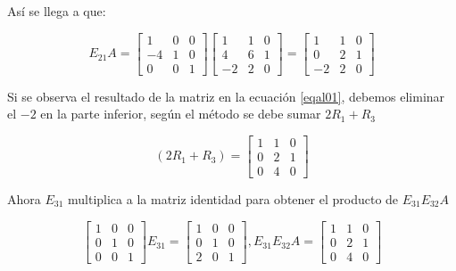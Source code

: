 \begin{enumerate}
	      Así se llega a que:

	      \begin{equation}
		      \label{eqal01}
		      E_{21}A= \begin{bmatrix}
			      1 & 0 & 0 \\ -4& 1& 0 \\0& 0& 1
		      \end{bmatrix}\begin{bmatrix}
			      1 & 1 & 0 \\ 4& 6& 1 \\-2& 2& 0
		      \end{bmatrix}= \begin{bmatrix}
			      1 & 1 & 0 \\0&2&1\\-2&2&0
		      \end{bmatrix}
	      \end{equation}

	      Si se observa el resultado de la matriz en la ecuación \eqref{eqal01}, debemos eliminar el $-2$ en la parte inferior, según el método se debe sumar $2R_{1}+R_{3}$

	      \begin{equation*}
		      (2R_{1}+R_{3})=
		      \begin{bmatrix}
			      1 & 1 & 0 \\0&2&1\\0&4&0
		      \end{bmatrix}
	      \end{equation*}

	      Ahora $E_{31}$ multiplica a la matriz identidad para obtener el producto de $E_{31}E_{32}A$

	      \begin{equation*}
		      \begin{bmatrix}
			      1 & 0 & 0 \\ 0& 1& 0 \\0& 0& 1
		      \end{bmatrix} E_{31}= \begin{bmatrix}
			      1 & 0 & 0 \\ 0& 1& 0 \\2& 0& 1
		      \end{bmatrix}, E_{31}E_{32}A= \begin{bmatrix}
			      1 & 1 & 0 \\ 0& 2& 1 \\ 0 &4 &0
		      \end{bmatrix}
	      \end{equation*}


\end{enumerate}

